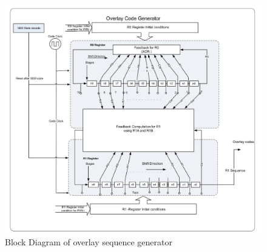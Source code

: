 \begin{figure}[ht]
\centering
\includegraphics[width=\columnwidth]{figs/overlay.png}
\centering
\captionsetup{justification=centering}
\caption{Block Diagram of overlay sequence generator}
\label{fig:overlay}
\end{figure}

